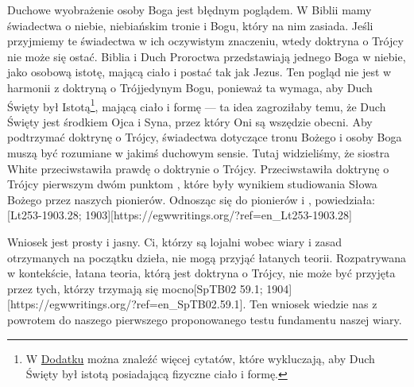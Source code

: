 Duchowe wyobrażenie osoby Boga jest błędnym poglądem. W Biblii mamy świadectwa o niebie, niebiańskim tronie i Bogu, który na nim zasiada. Jeśli przyjmiemy te świadectwa w ich oczywistym znaczeniu, wtedy doktryna o Trójcy nie może się ostać. Biblia i Duch Proroctwa przedstawiają jednego Boga w niebie, jako osobową istotę, mającą ciało i postać tak jak Jezus. Ten pogląd nie jest w harmonii z doktryną o Trójjedynym Bogu, ponieważ ta wymaga, aby Duch Święty był Istotą\footnote{W \hyperref[appendix:unauthenticated-reports]{Dodatku} można znaleźć więcej cytatów, które wykluczają, aby Duch Święty był istotą posiadającą fizyczne ciało i formę.}, mającą ciało i formę — ta idea zagroziłaby temu, że Duch Święty jest środkiem Ojca i Syna, przez który Oni są wszędzie obecni. Aby podtrzymać doktrynę o Trójcy, świadectwa dotyczące tronu Bożego i osoby Boga muszą być rozumiane w jakimś duchowym sensie. Tutaj widzieliśmy, że siostra White przeciwstawiła prawdę o  doktrynie o Trójcy. Przeciwstawiła doktrynę o Trójcy pierwszym dwóm punktom , które były wynikiem studiowania Słowa Bożego przez naszych pionierów. Odnosząc się do pionierów i , powiedziała: [Lt253-1903.28; 1903][https://egwwritings.org/?ref=en\_Lt253-1903.28]

Wniosek jest prosty i jasny. Ci, którzy są lojalni wobec wiary i zasad otrzymanych na początku dzieła, nie mogą przyjąć łatanych teorii. Rozpatrywana w kontekście, łatana teoria, którą jest doktryna o Trójcy, nie może być przyjęta przez tych, którzy trzymają się mocno[SpTB02 59.1; 1904][https://egwwritings.org/?ref=en\_SpTB02.59.1]. Ten wniosek wiedzie nas z powrotem do naszego pierwszego proponowanego testu fundamentu naszej wiary.
